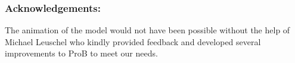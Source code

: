 \documentclass[a4paper]{llncs}
\begin{document}

\subsubsection{Acknowledgements:} The animation of the model would not
have been possible without the help of Michael Leuschel who kindly
provided feedback and developed several improvements to ProB to meet our
needs.


  

%




% 
\end{document}
